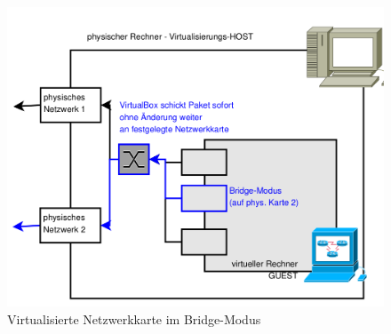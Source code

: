 \documentclass[paper=a4,fontsize=11pt]{scrartcl}%
\numberwithin{equation}{section}
\begin{document}
\begin{figure}[H]
\centering
\includegraphics[scale=0.35]{vbox6}
\caption{Virtualisierte Netzwerkkarte im Bridge-Modus}
\end{figure}
\end{document}
